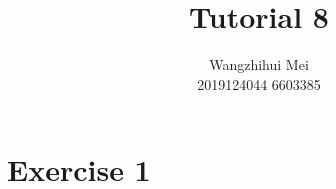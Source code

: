 \documentclass[12pt]{article}%
\begin{document}
\title{Tutorial 8}
\author{Wangzhihui Mei \\ 2019124044 6603385}
\date{}
\maketitle

\section*{Exercise 1}
\end{document}
